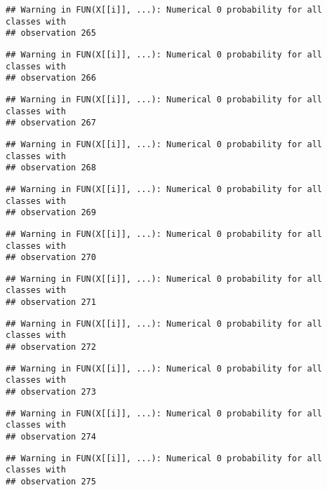 \documentclass[
]{article}
\begin{document}
\begin{verbatim}
## Warning in FUN(X[[i]], ...): Numerical 0 probability for all classes with
## observation 265
\end{verbatim}

\begin{verbatim}
## Warning in FUN(X[[i]], ...): Numerical 0 probability for all classes with
## observation 266
\end{verbatim}

\begin{verbatim}
## Warning in FUN(X[[i]], ...): Numerical 0 probability for all classes with
## observation 267
\end{verbatim}

\begin{verbatim}
## Warning in FUN(X[[i]], ...): Numerical 0 probability for all classes with
## observation 268
\end{verbatim}

\begin{verbatim}
## Warning in FUN(X[[i]], ...): Numerical 0 probability for all classes with
## observation 269
\end{verbatim}

\begin{verbatim}
## Warning in FUN(X[[i]], ...): Numerical 0 probability for all classes with
## observation 270
\end{verbatim}

\begin{verbatim}
## Warning in FUN(X[[i]], ...): Numerical 0 probability for all classes with
## observation 271
\end{verbatim}

\begin{verbatim}
## Warning in FUN(X[[i]], ...): Numerical 0 probability for all classes with
## observation 272
\end{verbatim}

\begin{verbatim}
## Warning in FUN(X[[i]], ...): Numerical 0 probability for all classes with
## observation 273
\end{verbatim}

\begin{verbatim}
## Warning in FUN(X[[i]], ...): Numerical 0 probability for all classes with
## observation 274
\end{verbatim}

\begin{verbatim}
## Warning in FUN(X[[i]], ...): Numerical 0 probability for all classes with
## observation 275
\end{verbatim}
\end{document}
